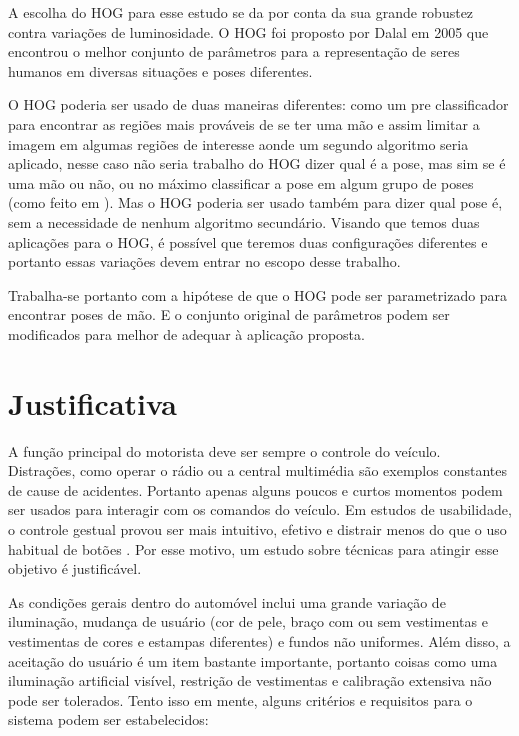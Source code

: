 A escolha do HOG para esse estudo se da por conta da sua grande robustez contra variações de luminosidade. O HOG foi proposto por Dalal em 2005\cite{dalal} que encontrou o melhor conjunto de parâmetros para a representação de seres humanos em diversas situações e poses diferentes. 

O HOG poderia ser usado de duas maneiras diferentes: como um pre classificador para encontrar as regiões mais prováveis de se ter uma mão e assim limitar a imagem em algumas regiões de interesse aonde um segundo algoritmo seria aplicado, nesse caso não seria trabalho do HOG dizer qual é a pose, mas sim se é uma mão ou não, ou no máximo classificar a pose em algum grupo de poses (como feito em \cite{ref10}). Mas o HOG poderia ser usado também para dizer qual pose é, sem a necessidade de nenhum algoritmo secundário.
Visando que temos duas aplicações para o HOG, é possível que teremos duas configurações diferentes e portanto essas variações devem entrar no escopo desse trabalho.

Trabalha-se portanto com a hipótese de que o HOG pode ser parametrizado para encontrar poses de mão. E o conjunto original de parâmetros podem ser modificados para melhor de adequar à aplicação proposta.

\section{Justificativa}

A função principal do motorista deve ser sempre o controle do veículo. Distrações, como operar o rádio ou a central multimédia são exemplos constantes de cause de acidentes. Portanto apenas alguns poucos e curtos momentos podem ser usados para interagir com os comandos do veículo. Em estudos de usabilidade, o controle gestual provou ser mais intuitivo, efetivo \cite{ref12}  \cite{ref13} e distrair menos do que o uso habitual de botões \cite{ref14}. Por esse motivo, um estudo sobre técnicas para atingir esse objetivo é justificável.

As condições gerais dentro do automóvel inclui uma grande variação de iluminação, mudança de usuário (cor de pele, braço com ou sem vestimentas e vestimentas de cores e estampas diferentes) e fundos não uniformes. Além disso, a aceitação do usuário é um item bastante importante, portanto coisas como uma iluminação artificial visível, restrição de vestimentas e calibração extensiva não pode ser tolerados. Tento isso em mente, alguns critérios e requisitos para o sistema podem ser estabelecidos:

